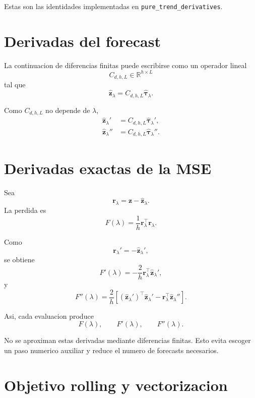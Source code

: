 \documentclass[11pt]{article}
\newcommand{\R}{\mathbb{R}}
\begin{document}
Estas son las identidades implementadas en
\texttt{pure\_trend\_derivatives}.

\section{Derivadas del forecast}

La continuacion de diferencias finitas puede escribirse como un operador lineal
\[
C_{d,h,L}\in\R^{h\times L}
\]
tal que
\begin{equation}
\widehat{\bm z}_\lambda
=
C_{d,h,L}
\widehat{\bm\tau}_\lambda.
\label{eq:forecast-operator}
\end{equation}

Como \(C_{d,h,L}\) no depende de \(\lambda\),
\begin{align}
\widehat{\bm z}_\lambda'
&=
C_{d,h,L}\widehat{\bm\tau}_\lambda',
\\
\widehat{\bm z}_\lambda''
&=
C_{d,h,L}\widehat{\bm\tau}_\lambda''.
\end{align}

\section{Derivadas exactas de la MSE}

Sea
\[
\bm r_\lambda
=
\bm z-\widehat{\bm z}_\lambda.
\]
La perdida es
\[
F(\lambda)
=
\frac{1}{h}
\bm r_\lambda^\top\bm r_\lambda.
\]

Como
\[
\bm r_\lambda'=-\widehat{\bm z}_\lambda',
\]
se obtiene
\begin{equation}
F'(\lambda)
=
-
\frac{2}{h}
\bm r_\lambda^\top
\widehat{\bm z}_\lambda',
\label{eq:mse-first}
\end{equation}
y
\begin{equation}
F''(\lambda)
=
\frac{2}{h}
\left[
(\widehat{\bm z}_\lambda')^\top
\widehat{\bm z}_\lambda'
-
\bm r_\lambda^\top
\widehat{\bm z}_\lambda''
\right].
\label{eq:mse-second}
\end{equation}

Asi, cada evaluacion produce
\[
\boxed{
F(\lambda),
\qquad
F'(\lambda),
\qquad
F''(\lambda)
}.
\]

No se aproximan estas derivadas mediante diferencias finitas. Esto evita
escoger un paso numerico auxiliar y reduce el numero de forecasts necesarios.

\section{Objetivo rolling y vectorizacion}
\end{document}
